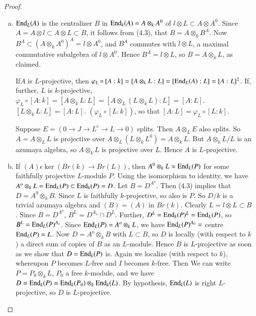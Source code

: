 \begin{proof}
\begin{enumerate}[(a)]
\item $\operatorname{End}_L (A)$ is the centralizer $B$ in $\operatorname{End}_k (A)= A \otimes_k
  A^0$ of $l \otimes L \subset A \otimes A^0$. Since $A = A \otimes l
  \subset A \otimes L \subset B$, it follows from (4.3), that $B =A
  \otimes_k B^A$. Now $B^A \subset (A \otimes_k A^0)^A= l \otimes
  A^0$, and $B^A$ commutes with $l \otimes L$, a maximal commutative
  subalgebra of $l \otimes A^0$. Hence $B^A =l  \otimes L$, so $B = A
  \otimes_k L$, as claimed. 
  
If\pageoriginale $A$ is $L$-projective, then $\varphi_L \circ [A : k] = [A
  \otimes_k L:L]= [\operatorname{End}_L (A) : L]= [A : L]^2$. If, further, $L$ is
$k$-projective, $\varphi_L \circ [A : k] = [A \otimes_k L :  L]= [A
  \otimes_L (L \otimes_k L) : L] = [A :L]$.$[L \otimes_k L :L]=[A 
  : L]$. $(\varphi_L \circ [ L : k])$, so that $[A :L] = \varphi_L \circ [L
  : k]$.  
  
Suppose $E = (0 \to J \to L^e \to L \to 0)$ splits. Then $A \otimes_L
E$ also splits. So $A = A \otimes_L L$ is projective over $A \otimes_L
(L \otimes_k L^0) =  A \otimes_k L$. But $A \otimes_k L /L$ is an
azumaya algebra, so $A \otimes_k L$ is projective over $L$. Hence $A$
is $L$-projective. 

\item If $(A) \epsilon \ker (Br (k) \to Br(L))$, then $A^0 \otimes_k L
  \approx \operatorname{End}_L (P)$ for some faithfully projective $L$-module
  $P$. Using the isomorphism to identity, we have $A^o \otimes_k L =
  \operatorname{End}_L (P) \subset \operatorname{End}_k (P) =D$. Let $B=D^{A^o}$. Then (4.3) implies
  that $D=A^0 \otimes_k B$. Since $L$ is faithfully $k$-projective, so
  also is $P$. So $D /k$ is a trivial azumaya algebra and $(B) =(A)$
  in $Br (k)$. Clearly $L = l \otimes L \subset B$. Since $B
  =D^{A^o}$, $B^L = D^{A_o} \cap D^L$. Further, $D^L =\operatorname{End}_k (P)^L =
  \operatorname{End}_L (P)$, so $B^L = \operatorname{End}_L (P)^{A_o}$. Since $\operatorname{End}_L (P) = A^o
  \otimes_k L$, we have $\operatorname{End}_L (P)^{A_0}=$ centre $\operatorname{End}_L (P) = L$. Now
  $D=A^o \otimes_k B$ with $L \subset B$, so $D$ is locally (with
  respect to $k$) a direct sum of copies of $B$ as an 
  $L$-module. Hence $B$ is $L$-projective as soon as we show that $D
  = \operatorname{End}_k (P)$ is. Again we localize (with respect to $k$), whereupon
  $P$ becomes $L$-free and $I$ becomes $k$-free. Then We can write $P
  =P_0 \otimes_k L$, $P_0$ a free $k$-module, and we have $D= \operatorname{End}_k
  (P) = \operatorname{End}_k (P_0) \otimes_k \operatorname{End}_k (L)$. By hypothesis, $\operatorname{End}_k
  (L)$ is right $L$-projective, so $D$ is $L$-projective.  
\end{enumerate}
\end{proof}


